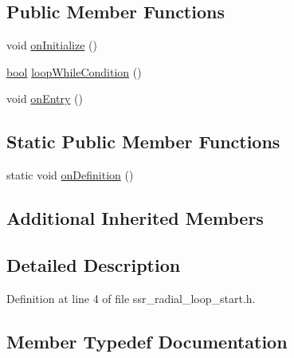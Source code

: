 \subsection*{Public Member Functions}
\begin{DoxyCompactItemize}
\item 
void \hyperlink{structsm__dance__bot__2_1_1radial__motion__states_1_1SsrRadialLoopStart_a574f9aaefa2c8c7e0579fa1d00fa2228}{on\+Initialize} ()
\item 
\hyperlink{classbool}{bool} \hyperlink{structsm__dance__bot__2_1_1radial__motion__states_1_1SsrRadialLoopStart_a04bbd83ffd4668efac4168ada8d8934c}{loop\+While\+Condition} ()
\item 
void \hyperlink{structsm__dance__bot__2_1_1radial__motion__states_1_1SsrRadialLoopStart_af4e58e69be00788dfff9d3cdccac1745}{on\+Entry} ()
\end{DoxyCompactItemize}
\subsection*{Static Public Member Functions}
\begin{DoxyCompactItemize}
\item 
static void \hyperlink{structsm__dance__bot__2_1_1radial__motion__states_1_1SsrRadialLoopStart_a7a65d246c919978990aa621589b8cb6e}{on\+Definition} ()
\end{DoxyCompactItemize}
\subsection*{Additional Inherited Members}


\subsection{Detailed Description}


Definition at line 4 of file ssr\+\_\+radial\+\_\+loop\+\_\+start.\+h.



\subsection{Member Typedef Documentation}
